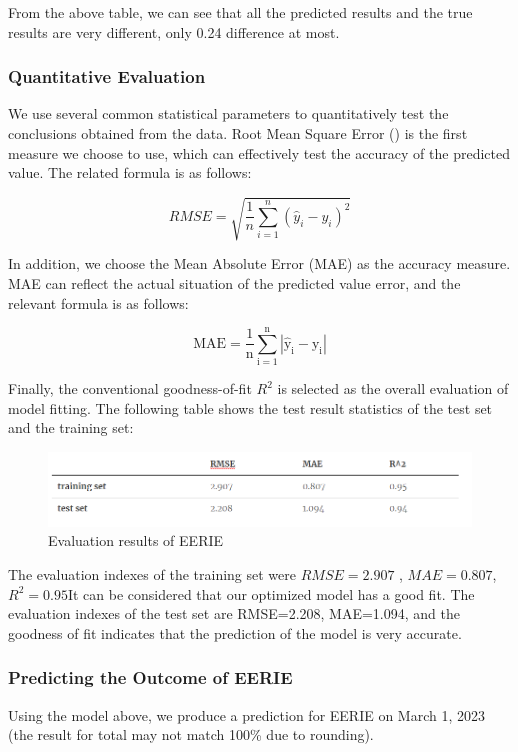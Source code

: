 \documentclass[12pt]{article}  %
\begin{document}
From the above table, we can see that all the predicted results and the true results are very different, only 0.24 difference at most.

\subsubsection{Quantitative Evaluation}
We use several common statistical parameters to quantitatively test the conclusions obtained from the data. Root Mean Square Error () is the first measure we choose to use, which can effectively test the accuracy of the predicted value. The related formula is as follows:

\begin{equation}\label{eq:RMSE}
R M S E=\sqrt{\frac{1}{n} \sum_{i=1}^{n}\left(\hat{y}_{i}-y_{i}\right)^{2}}
\end{equation}

In addition, we choose the Mean Absolute Error (MAE) as the accuracy measure. MAE can reflect the actual situation of the predicted value error, and the relevant formula is as follows:

\begin{equation}\label{eq:MAE}
\mathrm{MAE}=\frac{1}{\mathrm{n}} \sum_{\mathrm{i}=1}^{\mathrm{n}}\left|\hat{\mathrm{y}}_{\mathrm{i}}-\mathrm{y}_{\mathrm{i}}\right|
\end{equation}

Finally, the conventional goodness-of-fit $R^2$ is selected as the overall evaluation of model fitting. The following table shows the test result statistics of the test set and the training set:

\begin{figure}[htbp]
\centering
\includegraphics[width=.8\textwidth]{img/compare.png}
\caption{Evaluation results of EERIE}\label{fig:result}
\end{figure}

The evaluation indexes of the training set were $RMSE=2.907$ , $MAE=0.807$,$R^2=0.95$It can be considered that our optimized model has a good fit.
The evaluation indexes of the test set are RMSE=2.208, MAE=1.094, and the goodness of fit indicates that the prediction of the model is very accurate.

\subsubsection{Predicting the Outcome of EERIE}
Using the model above, we produce a prediction for EERIE on March 1, 2023 (the result for total may not match 100\% due to rounding).
\end{document}
